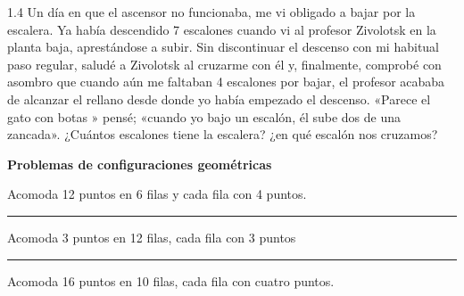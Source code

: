 1.4 Un día en que el ascensor no funcionaba, me vi obligado a bajar por la escalera. Ya había descendido 7 escalones cuando vi al profesor Zivolotsk en la planta baja, aprestándose a subir. Sin discontinuar el descenso con mi habitual paso regular, saludé a Zivolotsk al cruzarme con él y, finalmente, comprobé con asombro que cuando aún me faltaban 4 escalones por bajar, el profesor acababa de alcanzar el rellano desde donde yo había empezado el descenso. «Parece el gato con botas » pensé; «cuando yo bajo un escalón, él sube dos de una zancada». ¿Cuántos escalones tiene la escalera? ¿en qué escalón nos cruzamos?

\begin{center}
    \textbf{Problemas de configuraciones geométricas}
\end{center}

\begin{minipage}[t]{0.48\textwidth}
    \noindent
    \begin{excercise}
        Acomoda 12 puntos en 6 filas y cada fila con 4 puntos.
    \end{excercise}
\end{minipage}
\begin{minipage}[t]{0.48\textwidth}
    \noindent
    \begin{center}
    \end{center}
\end{minipage}
\par

\bigskip\hrule\bigskip

\par
\begin{minipage}[t]{0.48\textwidth}
    \noindent
    \begin{excercise}
        Acomoda 3 puntos en 12 filas, cada fila con 3 puntos
    \end{excercise}
\end{minipage}
\begin{minipage}[t]{0.48\textwidth}
    \noindent
    \begin{center}
    \end{center}
\end{minipage}
\par

\bigskip\hrule\bigskip

\par
\begin{minipage}[t]{0.48\textwidth}
    \noindent
    \begin{excercise}
        Acomoda 16 puntos en 10 filas, cada fila con cuatro puntos.
    \end{excercise}
\end{minipage}
\begin{minipage}[t]{0.48\textwidth}
    \noindent
    \begin{center}
    \end{center}
\end{minipage}
\par

